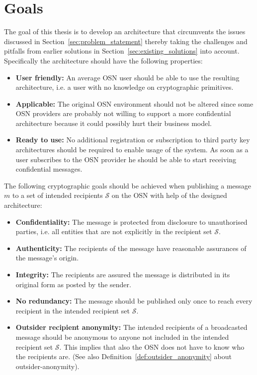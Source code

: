 \section{Goals}
The goal of this thesis is to develop an architecture that circumvents the issues discussed in Section~\ref{sec:problem_statement} thereby taking the challenges and pitfalls from earlier solutions in Section~\ref{sec:existing_solutions} into account. Specifically the architecture should have the following properties:
\begin{itemize}
 \item \textbf{User friendly:} An average OSN user should be able to use the resulting architecture, i.e. a user with no knowledge on cryptographic primitives.
 \item \textbf{Applicable:} The original OSN environment should not be altered since some OSN providers are probably not willing to support a more confidential architecture because it could possibly hurt their business model.
 \item \textbf{Ready to use:} No additional registration or subscription to third party key architectures should be required to enable usage of the system. As soon as a user subscribes to the OSN provider he should be able to start receiving confidential messages.
\end{itemize}

The following cryptographic goals should be achieved when publishing a message $m$ to a set of intended recipients $\mathcal{S}$ on the OSN with help of the designed architecture:
\begin{itemize}
 \item \textbf{Confidentiality:} The message is protected from disclosure to unauthorised parties, i.e. all entities that are not explicitly in the recipient set $\mathcal{S}$.
 \item \textbf{Authenticity:} The recipients of the message have reasonable assurances of the message's origin.
 \item \textbf{Integrity:} The recipients are assured the message is distributed in its original form as posted by the sender.
 \item \textbf{No redundancy:} The message should be published only once to reach every recipient in the intended recipient set $\mathcal{S}$.
 \item \textbf{Outsider recipient anonymity:} The intended recipients of a broadcasted message should be anonymous to anyone not included in the intended recipient set $\mathcal{S}$. This implies that also the OSN does not have to know who the recipients are. (See also Definition~\ref{def:outsider_anonymity} about outsider-anonymity).
\end{itemize}




